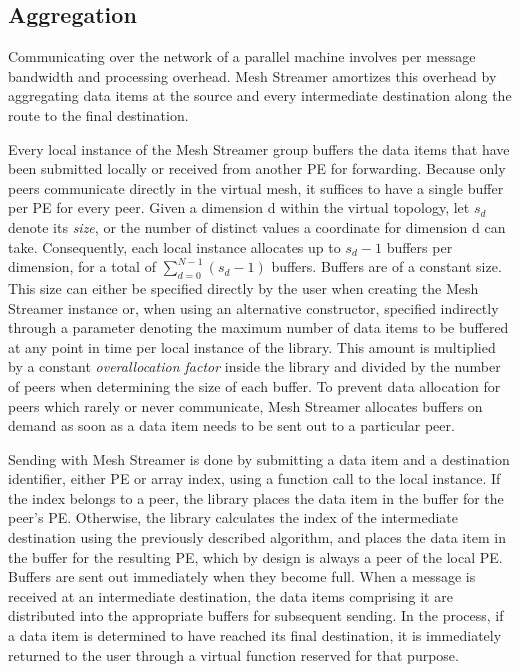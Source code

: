 \subsection{Aggregation}

Communicating over the network of a parallel machine involves per
message bandwidth and processing overhead. Mesh Streamer amortizes
this overhead by aggregating data items at the source and every
intermediate destination along the route to the final destination.

Every local instance of the Mesh Streamer group buffers the data items
that have been submitted locally or received from another PE for
forwarding. Because only peers communicate directly in the virtual
mesh, it suffices to have a single buffer per PE for every
peer. Given a dimension d within the virtual topology, let $s_d$
denote its \emph{size}, or the number of distinct values a coordinate
for dimension d can take. Consequently, each local instance allocates
up to $s_d - 1 $ buffers per dimension, for a total of
$\sum_{d=0}^{N-1} (s_d - 1) $ buffers. Buffers are of a constant
size. This size can either be specified directly by the user when
creating the Mesh Streamer instance or, when using an alternative
constructor, specified indirectly through a parameter denoting the
maximum number of data items to be buffered at any point in time per
local instance of the library.  This amount is multiplied by a
constant \emph{overallocation factor} inside the library and divided
by the number of peers when determining the size of each
buffer. To prevent data allocation for peers which rarely or never
communicate, Mesh Streamer allocates buffers on demand as soon as a
data item needs to be sent out to a particular peer.

Sending with Mesh Streamer is done by submitting a data item and a
destination identifier, either PE or array index, using a function
call to the local instance.  If the index belongs to a peer, the
library places the data item in the buffer for the peer's
PE. Otherwise, the library calculates the index of the intermediate
destination using the previously described algorithm, and places the
data item in the buffer for the resulting PE, which by design is
always a peer of the local PE. Buffers are sent out immediately
when they become full. When a message is received at an intermediate
destination, the data items comprising it are distributed into the
appropriate buffers for subsequent sending. In the process, if a data
item is determined to have reached its final destination, it is
immediately returned to the user through a virtual function reserved
for that purpose.

